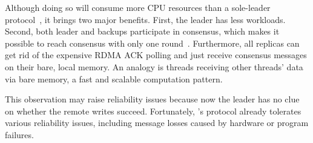 Although doing so will consume more CPU resources than a sole-leader 
protocol~\cite{dare:hpdc15}, it brings two major benefits. First, the leader 
has less workloads. Second, both leader and backups participate in consensus, 
which makes it possible to reach consensus with only one 
round~\cite{paxos:practical}. Furthermore, all replicas can get rid of 
the expensive RDMA ACK polling and just receive consensus messages on their 
bare, local memory. An analogy is threads receiving other threads' data via 
bare memory, a fast and scalable computation pattern.



This observation may raise reliability issues because now the leader has no 
clue on whether the remote writes succeed. Fortunately, \paxos's protocol 
already tolerates various reliability issues, including message losses caused by
hardware or program failures.






